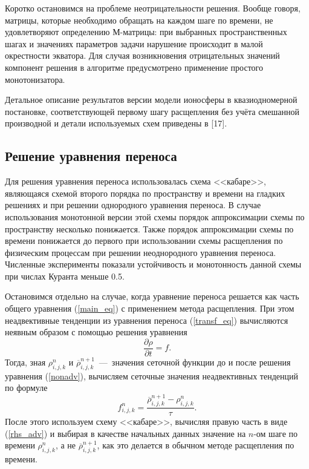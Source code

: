 \documentclass[14pt, a4paper]{extarticle}
\begin{document}
Коротко остановимся на проблеме неотрицательности решения. Вообще говоря, матрицы, которые необходимо обращать на каждом шаге по времени, не удовлетворяют определению М-матрицы: при выбранных пространственных шагах и значениях параметров задачи нарушение происходит в малой окрестности экватора. Для случая возникновения отрицательных значений компонент решения в алгоритме предусмотрено применение простого монотонизатора.

Детальное описание результатов версии модели ионосферы в квазиодномерной постановке, соответствующей первому шагу расщепления без учёта смешанной производной и детали используемых схем приведены в [17].

\subsection{Решение уравнения переноса}

Для решения уравнения переноса использовалась схема <<кабаре>>, являющаяся схемой второго порядка по пространству и времени на гладких решениях и при решении однородного уравнения переноса. В случае использования монотонной версии этой схемы порядок аппроксимации схемы по пространству несколько понижается. Также порядок аппроксимации схемы по времени понижается до первого при использовании схемы расщепления по физическим процессам при решении неоднородного уравнения переноса. Численные эксперименты показали устойчивость и монотонность данной схемы при числах Куранта меньше 0.5.


\vspace{5mm}

Остановимся отдельно на случае, когда уравнение переноса решается как часть общего уравнения (\ref{main_eq}) с применением метода расщепления. При этом неадвективные тенденции из уравнения переноса (\ref{transf_eq}) вычисляются неявным образом с помощью решения уравнения  \begin{equation}\label{nonadv}
\dfrac{\partial \rho}{\partial t} = f.
\end{equation}
Тогда, зная $\rho_{i, j, k}^n$ и $\overline{\rho}_{i, j, k}^{n+1}$~---~значения сеточной функции до и после решения уравнения (\ref{nonadv}), вычисляем сеточные значения неадвективных тенденций по формуле \begin{equation}\label{rhs_adv} f_{i, j, k}^n = \dfrac{\overline{\rho}_{i, j, k}^{n+1}-\rho_{i, j, k}^n}{\tau}. \end{equation}
После этого используем схему <<кабаре>>, вычисляя правую часть в виде (\ref{rhs_adv}) и выбирая в качестве начальных данных значение на $n$-ом шаге по времени $\rho_{i, j, k}^n$, а не $\overline{\rho}_{i, j, k}^{n+1}$, как это делается в обычном методе расщепления по времени.
\end{document}
